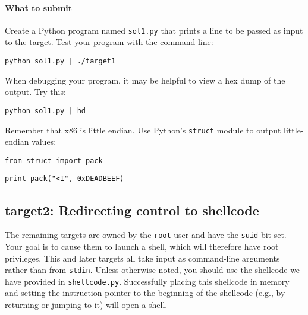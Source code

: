 \documentclass[letterpaper,12pt]{report}
\begin{document}
{\begin{enumerate}
\end{enumerate}

\paragraph{What to submit}
Create a Python program named \texttt{sol1.py} that prints a line to be passed as input to the target.  Test your program with the command line:

\smallskip

\quad\texttt{python sol1.py | ./target1}

\medskip

When debugging your program, it may be helpful to view a hex dump of the output.  Try this:
\smallskip

\quad\texttt{python sol1.py | hd}
\medskip

Remember that x86 is little endian.  Use Python's \texttt{struct} module to output little-endian values:
\smallskip

\quad\texttt{from struct import pack}

\quad\texttt{print pack("<I", 0xDEADBEEF)}

\subsection*{target2: Redirecting control to shellcode}
\label{sec:target2}

The remaining targets are owned by the \texttt{root} user and have the \texttt{suid} bit set.  Your goal is to cause them to launch a shell, which will therefore have root privileges.  This and later targets all take input as command-line arguments rather than from \texttt{stdin}.  Unless otherwise noted, you should use the shellcode we have provided in \texttt{shellcode.py}.  Successfully placing this shellcode in memory and setting the instruction pointer to the beginning of the shellcode (e.g., by returning or jumping to it) will open a shell.

}
\end{document}
